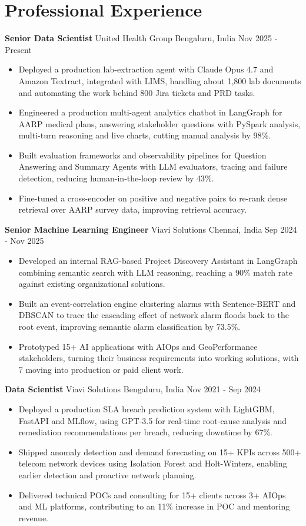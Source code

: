\documentclass[10pt,a4paper]{article}
\newcommand{\role}[4]{\textbf{#1} \textbar{} #2 \hfill #3 \textbar{} #4\par}
\begin{document}
\section{Professional Experience}
\role{Senior Data Scientist}{United Health Group}{Bengaluru, India}{Nov 2025 - Present}
\begin{itemize}
  \item Deployed a production lab-extraction agent with Claude Opus 4.7 and Amazon Textract, integrated with LIMS, handling about 1,800 lab documents and automating the work behind 800 Jira tickets and PRD tasks.
  \item Engineered a production multi-agent analytics chatbot in LangGraph for AARP medical plans, answering stakeholder questions with PySpark analysis, multi-turn reasoning and live charts, cutting manual analysis by 98\%.
  \item Built evaluation frameworks and observability pipelines for Question Answering and Summary Agents with LLM evaluators, tracing and failure detection, reducing human-in-the-loop review by 43\%.
  \item Fine-tuned a cross-encoder on positive and negative pairs to re-rank dense retrieval over AARP survey data, improving retrieval accuracy.
\end{itemize}
\vspace{3pt}
\role{Senior Machine Learning Engineer}{Viavi Solutions}{Chennai, India}{Sep 2024 - Nov 2025}
\begin{itemize}
  \item Developed an internal RAG-based Project Discovery Assistant in LangGraph combining semantic search with LLM reasoning, reaching a 90\% match rate against existing organizational solutions.
  \item Built an event-correlation engine clustering alarms with Sentence-BERT and DBSCAN to trace the cascading effect of network alarm floods back to the root event, improving semantic alarm classification by 73.5\%.
  \item Prototyped 15+ AI applications with AIOps and GeoPerformance stakeholders, turning their business requirements into working solutions, with 7 moving into production or paid client work.
\end{itemize}
\vspace{3pt}
\role{Data Scientist}{Viavi Solutions}{Bengaluru, India}{Nov 2021 - Sep 2024}
\begin{itemize}
  \item Deployed a production SLA breach prediction system with LightGBM, FastAPI and MLflow, using GPT-3.5 for real-time root-cause analysis and remediation recommendations per breach, reducing downtime by 67\%.
  \item Shipped anomaly detection and demand forecasting on 15+ KPIs across 500+ telecom network devices using Isolation Forest and Holt-Winters, enabling earlier detection and proactive network planning.
  \item Delivered technical POCs and consulting for 15+ clients across 3+ AIOps and ML platforms, contributing to an 11\% increase in POC and mentoring revenue.
\end{itemize}
\end{document}
